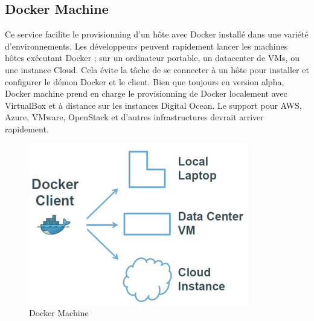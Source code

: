 \begin{onehalfspace}
\subsection{Docker Machine}
 Ce service facilite le provisionning d'un hôte avec Docker installé dans une variété d'environnements. Les développeurs peuvent rapidement lancer les machines hôtes exécutant Docker ; sur un ordinateur portable, un datacenter de VMs, ou une instance Cloud. Cela évite la tâche de se connecter à un hôte pour installer et configurer le démon Docker et le client. Bien que toujours en version alpha, Docker machine prend en charge le provisionning de Docker localement avec VirtualBox et à distance sur les instances Digital Ocean. Le support pour AWS, Azure, VMware, OpenStack et d'autres infrastructures devrait arriver rapidement.
 \begin{figure}[H]
\centering
\includegraphics [scale=0.6]{chapitre3/assets/dockermachine.png}
\caption{Docker Machine}
\end{figure}

\end{onehalfspace}
